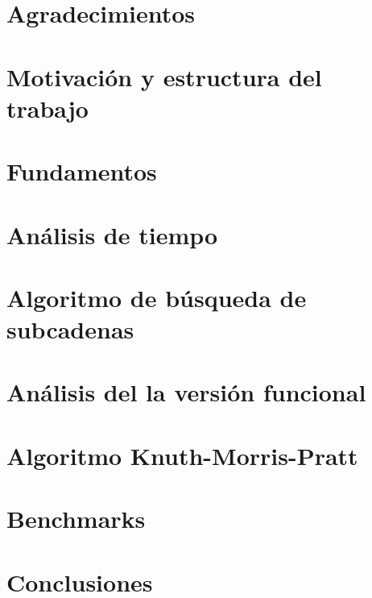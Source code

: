 \documentclass{book}
\begin{document}
\thispagestyle{empty}
\frontmatter
    
    \clearpage
    \mbox{}
    \clearpage
    \thispagestyle{empty}
    
    
    
    \chapter*{Agradecimientos}
    
    \clearpage
    
    \tableofcontents


\mainmatter
    \chapter*{Motivación y estructura del trabajo}
        
    
    \chapter{Fundamentos}
        
    
    \chapter{Análisis de tiempo}
        
    
    \chapter{Algoritmo de búsqueda de subcadenas}
        
    
    \chapter{Análisis del la versión funcional}
        
    
    \chapter{Algoritmo Knuth-Morris-Pratt}
        
    
    \chapter{Benchmarks}
        

    \chapter{Conclusiones}
        


\backmatter
    \nocite{*}
    \printbibliography
\end{document}
